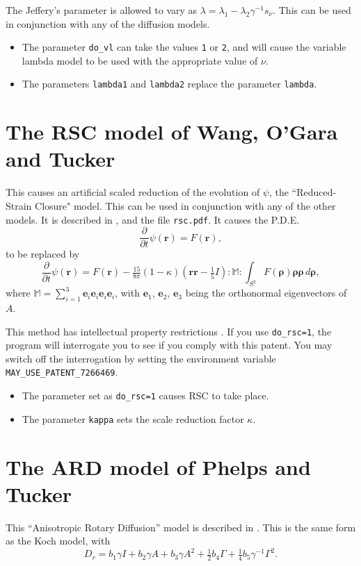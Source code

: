 \documentclass{amsart}
\newcommand{\br}{{\mathbf r}}
\newcommand{\e}{{\mathbf e}}
\newcommand{\brho}{{\boldsymbol \rho}}
\begin{document}
\noindent
The Jeffery's parameter is allowed to vary as $\lambda = \lambda_1 - \lambda_2 \gamma^{-1} s_\nu $.
This can be used in conjunction with any of the diffusion models.
\begin{itemize}
\item The parameter {\tt do\_vl} can take the values {\tt 1} or {\tt 2}, and will cause the variable lambda model to be used with the appropriate value of $\nu$.
\item The parameters {\tt lambda1} and {\tt lambda2} replace the parameter {\tt lambda}.
\end{itemize}

\section*{The RSC model of Wang, O'Gara and Tucker}

\noindent
This causes an artificial scaled reduction of the evolution of $\psi$, the ``Reduced-Strain Closure" model.  This can be used in conjunction with any of the other models.  It is described in \cite{rsc}, and the file {\tt rsc.pdf}.  It causes the P.D.E.\ 
$$ \frac{\partial}{\partial t}\psi(\br) = F(\br),$$
to be replaced by
$$ \frac{\partial}{\partial t}\psi(\br) = F(\br) - \tfrac{15}{8\pi}(1-\kappa)(\br\br-\tfrac15 I):\mathbb M:\int_{S^2} F(\brho) \brho\brho \, d\brho,$$
where $\mathbb M = \sum_{i=1}^3 \e_i\e_i\e_i\e_i$, with $\e_1$, $\e_2$, $\e_3$ being the orthonormal eigenvectors of $A$.

This method has intellectual property restrictions \cite{rsc-pat}.  If you use {\tt do\_rsc=1}, the program will interrogate you to see if you comply with this patent.  You may switch off the interrogation by setting the environment variable {\tt MAY\_USE\_PATENT\_7266469}.

\begin{itemize}
\item The parameter set as {\tt do\_rsc=1} causes RSC to take place.
\item The parameter {\tt kappa} sets the scale reduction factor $\kappa$.
\end{itemize}

\section*{The ARD model of Phelps and Tucker}

\noindent
This ``Anisotropic Rotary Diffusion'' model is described in \cite{ard}.  This is the same form as the Koch model, with
$$ D_r = b_1 \gamma I + b_2 \gamma A + b_3 \gamma A^2 + \tfrac12{b_4} \Gamma + \tfrac14{b_5}\gamma^{-1} \Gamma^2 .$$
\end{document}
